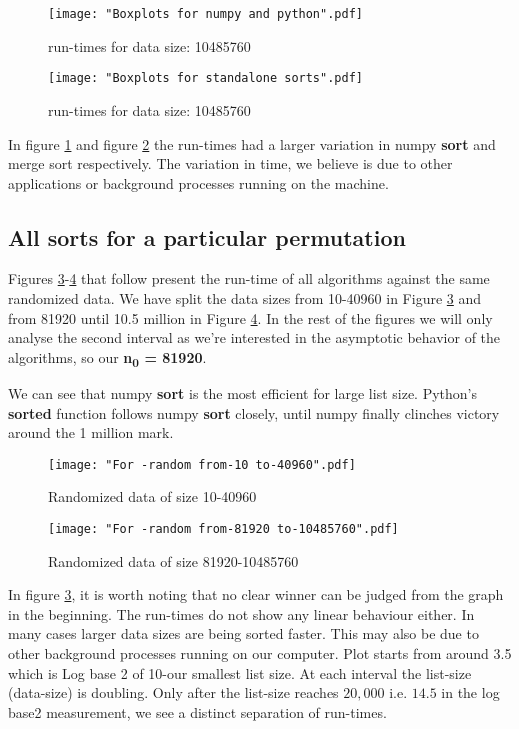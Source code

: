 \documentclass[sigconf, nonacm, natbib, screen, balance=False]{acmart}
\begin{document}
\begin{figure}[ht]
\texttt{[image: "Boxplots for numpy and python".pdf]}
    \caption{run-times for data size: 10485760 }
    \label{fig:box1}
\end{figure}

\begin{figure}[ht]
\texttt{[image: "Boxplots for standalone sorts".pdf]}
    \caption{run-times for data size: 10485760  }
    \label{fig:box2}
\end{figure}

In figure \ref{fig:box1} and figure \ref{fig:box2} the run-times had a larger variation in numpy \textbf{sort} and merge sort respectively. The variation in time, we believe is due to other applications or background processes running on the machine.

\subsection{All sorts for a particular permutation }\label{allsorts}

Figures \ref{fig:random1}-\ref{fig:random2} that follow present the run-time of all algorithms against the same randomized data. We have split the data sizes from 10-40960 in Figure \ref{fig:random1} and from 81920 until 10.5 million in Figure \ref{fig:random2}. In the rest of the figures we will only analyse the second interval as we're interested in the asymptotic behavior of the algorithms, so our \textbf{n\textsubscript{0} = 81920}.

We can see that numpy \textbf{sort} is the most efficient for large list size. Python's \textbf{sorted} function follows numpy \textbf{sort} closely, until numpy finally clinches victory around the 1 million mark.

\begin{figure}[ht]
\texttt{[image: "For -random from-10 to-40960".pdf]}
    \caption{Randomized data of size 10-40960 }
    \label{fig:random1}
\end{figure}

\begin{figure}[ht]
\texttt{[image: "For -random from-81920 to-10485760".pdf]}
    \caption{Randomized data of size 81920-10485760}
    \label{fig:random2}
\end{figure}

In figure \ref{fig:random1}, it is worth noting that no clear winner can be judged from the graph in the beginning. The run-times do not show any linear behaviour either. In many cases larger data sizes are being sorted faster. This may also be due to other background processes running on our computer. Plot starts from around 3.5 which is Log base 2 of 10-our smallest list size. At each interval the list-size (data-size) is doubling. Only after the list-size reaches \textbf{$20,000$} i.e. \textbf{$14.5$} in the log base2 measurement, we see a distinct separation of run-times.
\end{document}
